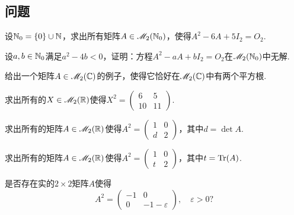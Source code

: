 \subsection{问题}
\begin{problem}
  \begin{enum}
    \item 设$\mathbb N_0=\{0\}\cup\mathbb N$，求出所有矩阵$A\in\mathscr M_2(\mathbb N_0)$，使得$A^2-6A+5I_2=O_2$.
    \item 设$a,b\in\mathbb N_0$满足$a^2-4b<0$，证明：方程$A^2-aA+bI_2=O_2$在$\mathscr M_2(\mathbb N_0)$中无解.
  \end{enum}
\end{problem}

\begin{problem}
  给出一个矩阵$A\in\mathscr M_2(\mathbb C)$的例子，使得它恰好在$\mathscr M_2(\mathbb C)$中有两个平方根.
\end{problem}

\begin{problem}
  求出所有的$X\in\mathscr M_2(\mathbb R)$使得$X^2=\begin{pmatrix}
    6 & 5 \\
    10 & 11
  \end{pmatrix}$.
\end{problem}

\begin{problem}
  \begin{inparaenum}[(a)]
    \item 求出所有的矩阵$A\in\mathscr M_2(\mathbb R)$使得$A^2=\begin{pmatrix}
          1 & 0 \\
          d & 2
        \end{pmatrix}$，其中$d=\det A$.

    \item 求出所有的矩阵$A\in\mathscr M_2(\mathbb R)$使得$A^2=\begin{pmatrix}
          1 & 0 \\
          t & 2
        \end{pmatrix}$，其中$t=\operatorname{Tr}(A)$.
  \end{inparaenum}
\end{problem}

\begin{problem}
  是否存在实的$2\times2$矩阵$A$使得
  \[
    A^2 = \begin{pmatrix}
      -1 & 0 \\
      0 & -1 - \varepsilon
    \end{pmatrix},\quad \varepsilon>0?
  \]
\end{problem}


